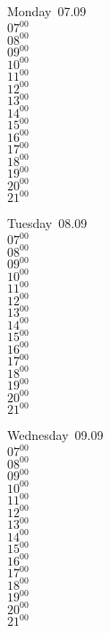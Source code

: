 \documentclass[11pt,a4paper]{book}\usepackage[]{graphicx}\usepackage[]{color}
\begin{document}
\begin{headerbox}
\end{headerbox}
\begin{weekdaybox}
  Monday~07.09\\
  { 
  \vfill
  $07^{00}$\\
$08^{00}$\\
$09^{00}$\\
$10^{00}$\\
$11^{00}$\\
$12^{00}$\\
$13^{00}$\\
$14^{00}$\\
$15^{00}$\\
$16^{00}$\\
$17^{00}$\\
$18^{00}$\\
$19^{00}$\\
$20^{00}$\\
$21^{00}$\\
  }
\end{weekdaybox}
\begin{weekdaybox}
  Tuesday~08.09\\
  { 
  \vfill
  $07^{00}$\\
$08^{00}$\\
$09^{00}$\\
$10^{00}$\\
$11^{00}$\\
$12^{00}$\\
$13^{00}$\\
$14^{00}$\\
$15^{00}$\\
$16^{00}$\\
$17^{00}$\\
$18^{00}$\\
$19^{00}$\\
$20^{00}$\\
$21^{00}$\\
  }
\end{weekdaybox}
\begin{weekdaybox}
  Wednesday~09.09\\
  { 
  \vfill
  $07^{00}$\\
$08^{00}$\\
$09^{00}$\\
$10^{00}$\\
$11^{00}$\\
$12^{00}$\\
$13^{00}$\\
$14^{00}$\\
$15^{00}$\\
$16^{00}$\\
$17^{00}$\\
$18^{00}$\\
$19^{00}$\\
$20^{00}$\\
$21^{00}$\\
  }
\end{weekdaybox}
\end{document}
